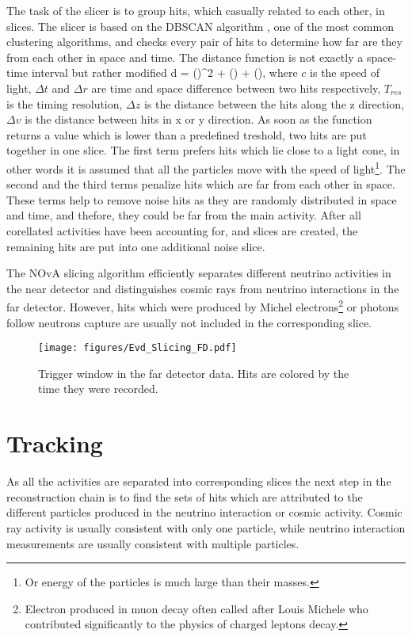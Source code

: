 The task of the slicer is to group hits, which casually related to each other, in slices. The slicer 
is based on the DBSCAN algorithm \cite{DBSCAN}, one of the most common clustering algorithms, and checks 
every pair of hits to determine how far are they from each other in space and time. The distance 
function is not exactly a space-time interval but rather modified 
\be
d = \Big(\Big)^2 + \Big(\Big) + 
\Big(\Big),
\ee 
where $c$ is the speed of light, $\Delta t$ and $\Delta r$ are time and space difference between two 
hits respectively, $T_{res}$ is the timing resolution, $\Delta z$ is the distance between the hits
along the z direction, $\Delta v$ is the distance between hits in x or y direction. As soon as the 
function returns a value which is lower than a predefined treshold, two hits are put together in one slice.
The first term prefers hits which lie close to a light cone, in other words it is assumed that all
the particles move with the speed of light\footnote{Or energy of the particles is much large than their 
masses.}. The second and the third terms penalize hits which are far from each other in space. These
terms help to remove noise hits as they are randomly distributed in space and time, and thefore, they 
could be far from the main activity. After all corellated activities have been accounting for, and 
slices are created, the remaining hits are put into one additional noise slice.

The NOvA slicing algorithm efficiently separates different neutrino activities in the near detector
and distinguishes cosmic rays from neutrino interactions in the far detector. However, hits which were produced
by Michel electrons\footnote{Electron produced in muon decay often called after Louis Michele who
contributed significantly to the physics of charged leptons decay.} or photons follow neutrons capture are
usually not included in the corresponding slice.
\begin{figure}[t]
\texttt{[image: figures/Evd\_Slicing\_FD.pdf]}
\centering
\caption{Trigger window in the far detector data. Hits are colored by the time they were recorded.} 
\label{fig:EVD_full}
\end{figure}

\section{Tracking}
As all the activities are separated into corresponding slices the next step in the reconstruction chain is 
to find the sets of hits which are attributed to the different particles produced in the neutrino interaction 
or cosmic activity. Cosmic ray activity is usually consistent with only one particle, while neutrino 
interaction measurements are usually consistent with multiple particles.

